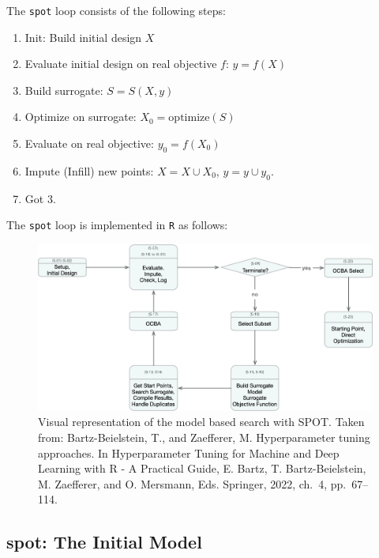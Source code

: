 \documentclass[
  letterpaper,
  DIV=11,
  numbers=noendperiod]{scrreprt}
\providecommand{\tightlist}{%
  \setlength{\itemsep}{0pt}\setlength{\parskip}{0pt}}\usepackage{longtable,booktabs,array}
\begin{document}
The \texttt{spot} loop consists of the following steps:

\begin{enumerate}
\def\labelenumi{\arabic{enumi}.}
\tightlist
\item
  Init: Build initial design \(X\)
\item
  Evaluate initial design on real objective \(f\): \(y = f(X)\)
\item
  Build surrogate: \(S = S(X,y)\)
\item
  Optimize on surrogate: \(X_0 = \text{optimize}(S)\)
\item
  Evaluate on real objective: \(y_0 = f(X_0)\)
\item
  Impute (Infill) new points: \(X = X \cup X_0\), \(y = y \cup y_0\).
\item
  Got 3.
\end{enumerate}

The \texttt{spot} loop is implemented in \texttt{R} as follows:

\begin{figure}

{\centering \includegraphics{figures_static/spotModel.png}

}

\caption{Visual representation of the model based search with SPOT.
Taken from: Bartz-Beielstein, T., and Zaefferer, M. Hyperparameter
tuning approaches. In Hyperparameter Tuning for Machine and Deep
Learning with R - A Practical Guide, E. Bartz, T. Bartz-Beielstein, M.
Zaefferer, and O. Mersmann, Eds. Springer, 2022, ch.~4, pp.~67--114.}

\end{figure}

\hypertarget{spot-the-initial-model}{%
\subsection{spot: The Initial Model}\label{spot-the-initial-model}}
\end{document}
